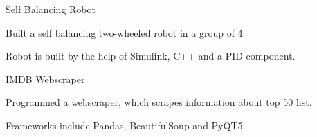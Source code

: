 
\begin{cventries}
  \cventry
    {} %
    {Self Balancing Robot} %
    {} %
    {} %
    {
      \begin{cvitems} %
      	\item {Built a self balancing two-wheeled robot in a group of 4.}
		\item {Robot is built by the help of Simulink, C++ and a PID component.}
      \end{cvitems}
    }

  \cventry
    {} %
    {IMDB Webscraper} %
    {} %
    {} %
    {
      \begin{cvitems} %
      	\item {Programmed a webscraper, which scrapes information about top 50 list.}
		\item {Frameworks include Pandas, BeautifulSoup and PyQT5.}
      \end{cvitems}
    }
\end{cventries}